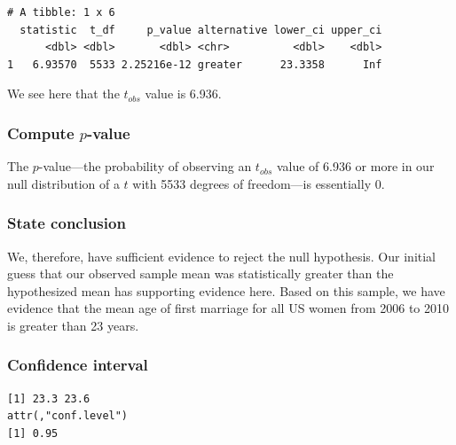 \documentclass[12pt, krantz2,]{krantz}
\makeatletter
\newenvironment{Shaded}{\begin{snugshade}}{\end{snugshade}}
\newcommand{\DataTypeTok}[1]{\textcolor[rgb]{0.27,0.27,0.27}{#1}}
\newcommand{\DecValTok}[1]{\textcolor[rgb]{0.06,0.06,0.06}{#1}}
\newcommand{\KeywordTok}[1]{\textcolor[rgb]{0.27,0.27,0.27}{\textbf{#1}}}
\newcommand{\NormalTok}[1]{#1}
\newcommand{\OperatorTok}[1]{\textcolor[rgb]{0.43,0.43,0.43}{\textbf{#1}}}
\newcommand{\StringTok}[1]{\textcolor[rgb]{0.5,0.5,0.5}{#1}}
\newenvironment{kframe}{%
\medskip{}
\setlength{\fboxsep}{.8em}
 \def\at@end@of@kframe{}%
 \ifinner\ifhmode%
  \def\at@end@of@kframe{\end{minipage}}%
  \begin{minipage}{\columnwidth}%
 \fi\fi%
 \def\FrameCommand##1{\hskip\@totalleftmargin \hskip-\fboxsep
 \colorbox{shadecolor}{##1}\hskip-\fboxsep
     \hskip-\linewidth \hskip-\@totalleftmargin \hskip\columnwidth}%
 \MakeFramed {\advance\hsize-\width
   \@totalleftmargin\z@ \linewidth\hsize
   \@setminipage}}%
 {\par\unskip\endMakeFramed%
 \at@end@of@kframe}
\renewenvironment{Shaded}{\begin{kframe}}{\end{kframe}}
\makeatother
\begin{document}
\begin{verbatim}
# A tibble: 1 x 6
  statistic  t_df     p_value alternative lower_ci upper_ci
      <dbl> <dbl>       <dbl> <chr>          <dbl>    <dbl>
1   6.93570  5533 2.25216e-12 greater      23.3358      Inf
\end{verbatim}

We see here that the \(t_{obs}\) value is 6.936.

\hypertarget{compute-p-value}{%
\subsubsection*{\texorpdfstring{Compute \(p\)-value}{Compute p-value}}\label{compute-p-value}}


The \(p\)-value---the probability of observing an \(t_{obs}\) value of 6.936 or more in our null distribution of a \(t\) with 5533 degrees of freedom---is essentially 0.

\hypertarget{state-conclusion}{%
\subsubsection*{State conclusion}\label{state-conclusion}}


We, therefore, have sufficient evidence to reject the null hypothesis. Our initial guess that our observed sample mean was statistically greater than the hypothesized mean has supporting evidence here. Based on this sample, we have evidence that the mean age of first marriage for all US women from 2006 to 2010 is greater than 23 years.

\hypertarget{confidence-interval}{%
\subsubsection*{Confidence interval}\label{confidence-interval}}


\begin{Shaded}
\end{Shaded}

\begin{verbatim}
[1] 23.3 23.6
attr(,"conf.level")
[1] 0.95
\end{verbatim}
\end{document}
